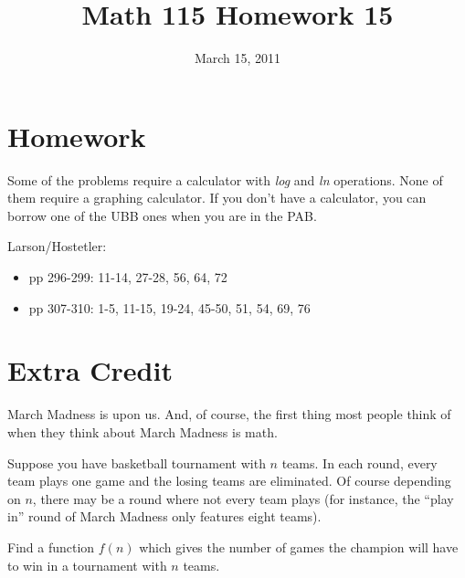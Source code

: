 \documentclass[fleqn,addpoints]{exam}
\title{Math 115 Homework 15}
\date{March 15, 2011}
\begin{document}
\maketitle


\section{Homework}

Some of the problems require a calculator with {\em log} and {\em ln} operations.  None of them require a graphing
calculator.  If you don't have a calculator, you can borrow one of the UBB ones when you are in the PAB.

Larson/Hostetler:

\begin{itemize}
  \item pp 296-299: 11-14, 27-28, 56, 64, 72
  \item pp 307-310: 1-5, 11-15, 19-24, 45-50, 51, 54, 69, 76
\end{itemize}


\section{Extra Credit}

March Madness is upon us.  And, of course, the first thing most people think of when they think about March Madness is math.

Suppose you have basketball tournament with $n$ teams.  In each round, every team plays one game and the losing teams
are eliminated.  Of course depending on $n$, there may be a round where not every team plays (for instance, the 
``play in'' round of March Madness only features eight teams).

Find a function $f(n)$ which gives the number of games the champion will have to win in a tournament with $n$ teams.
\end{document}
